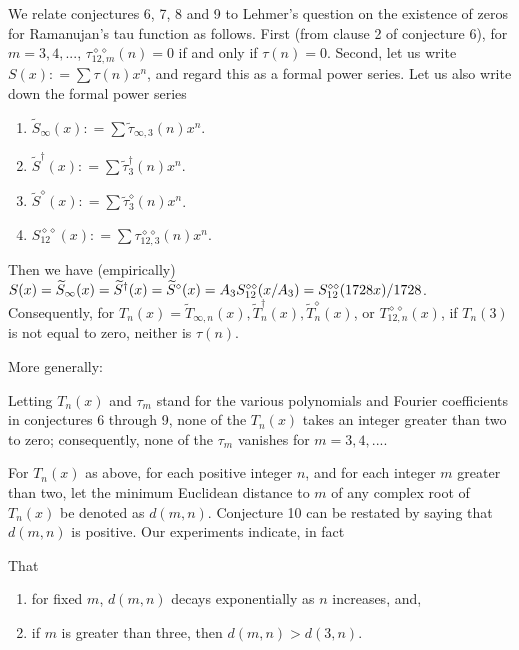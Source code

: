 \documentclass{article}
\begin{document}
 \begin{remark} We relate
 conjectures 6, 7, 8 and 9 to Lehmer's question on the
 existence of zeros for Ramanujan's tau function
 as follows. First (from clause 2 of conjecture 6), 
 for $m = 3, 4, ...$,
 $\tau^{\diamond \diamond}_{12,m}(n) = 0$
 if and only if $\tau(n) = 0$. Second, let us write 
 $S(x): = \sum \tau(n) x^n$, and regard this as a 
 formal power series.
 Let us also write down the formal power series
 \begin{enumerate}
  \item
 $\widetilde{S}_{\infty}(x): = 
 \sum \tilde{\tau}_{\infty,3}(n) x^n$.
  \item
 $\widetilde{S}^{\dagger}(x): = 
 \sum \tilde{\tau}^{\dagger}_3(n) x^n$.
 \item
 $\widetilde{S}^{\diamond}(x): = 
 \sum \widetilde{\tau}^{\diamond}_3(n) x^n$.
 \item
 $S^{\diamond \diamond}_{12}(x): = 
 \sum \tau^{\diamond \diamond}_{12,3}(n) x^n$.
 \end{enumerate}
 Then we have (empirically)
 $S(x) = \widetilde{S}_{\infty}(x) = 
 \widetilde{S}^{\dagger}(x) = 
 \widetilde{S}^{\diamond}(x) =
 A_3 S^{\diamond \diamond}_{12}(x/A_3) = \newline
 S^{\diamond \diamond}_{12}(1728x)/1728$. Consequently, 
 for $T_n(x) = 
 \widetilde{T}_{\infty,n}(x), \widetilde{T}^{\dagger}_n(x),
 \widetilde{T}^{\diamond}_n(x)$, 
or $T^{\diamond \diamond}_{12,n}(x)$, 
if  $T_n(3)$ is not equal to zero,
neither is $\tau(n)$.
 \end{remark} \noindent
More generally:
\begin{conjecture}
Letting $T_n(x)$ and  $\tau_m$ stand for
the various polynomials and Fourier coefficients
in conjectures 6 through 9,
none of the $T_n(x)$ takes an integer 
greater than two
to zero; consequently, none of the $\tau_m$ vanishes
for $m = 3, 4, ....$
\end{conjecture} \noindent
For $T_n(x)$ as above,
for each positive integer $n$, and for
each integer $m$ greater than two,
let the minimum Euclidean distance to $m$
of any complex root of $T_n(x)$ be denoted as
$d(m,n)$.
Conjecture 10
can be restated by saying that $d(m,n)$ is positive. 
Our experiments indicate, in fact
\begin{conjecture}
That
\begin{enumerate}
 \item
 for fixed $m$,  $d(m,n)$ decays exponentially as 
 $n$ increases, and,  
 \item if $m$ is greater
than three, then $d(m,n) > d(3,n)$.
\end{enumerate}
\end{conjecture}
\end{document}
